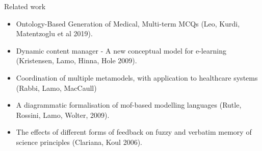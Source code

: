 \documentclass{beamer}
\begin{document}
\begin{frame}{Related work}
\begin{itemize}
	\item Ontology-Based Generation of Medical, Multi-term MCQs (Leo, Kurdi, Matentzoglu et al 2019).
	\item Dynamic content manager - A new conceptual model for e-learning (Kristensen, Lamo, Hinna, Hole 2009).
	\item Coordination of multiple metamodels, with application to healthcare systems (Rabbi, Lamo, MacCaull)
	\item A	diagrammatic formalisation of mof-based modelling languages (Rutle, Rossini, Lamo, Wolter, 2009).
	\item The effects of different forms of	feedback on fuzzy and verbatim memory of science principles (Clariana, Koul 2006).
\end{itemize}
\end{frame}
\end{document}
